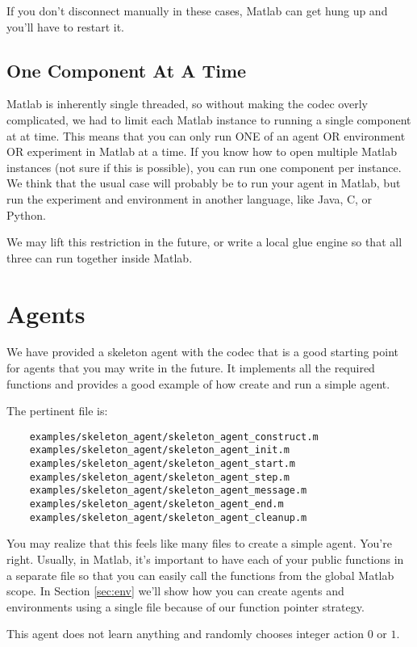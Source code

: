 \documentclass[11pt]{article}
\begin{document}
If you don't disconnect manually in these cases, Matlab can get hung up and you'll have to restart it.

\subsection{One Component At A Time}
Matlab is inherently single threaded, so without making the codec overly complicated, we had to limit each Matlab instance to running a single component at at time.
This means that you can only run ONE of an agent OR environment OR experiment in Matlab at a time.  If you know how to open multiple Matlab instances (not sure if this is possible), you can run one
component per instance.  We think that the usual case will probably be to run your agent in Matlab, but run the experiment and environment in another language, like Java, C, or Python.

We may lift this restriction in the future, or write a local glue engine so that all three can run together inside Matlab.

\section{Agents}
\label{sec:agent}
We have provided a skeleton agent with the codec that is a good starting point for agents that you may write in the future.
It implements all the required functions and provides a good example of how create and run a simple agent.

The pertinent file is:
\begin{verbatim}
	examples/skeleton_agent/skeleton_agent_construct.m
	examples/skeleton_agent/skeleton_agent_init.m
	examples/skeleton_agent/skeleton_agent_start.m
	examples/skeleton_agent/skeleton_agent_step.m
	examples/skeleton_agent/skeleton_agent_message.m
	examples/skeleton_agent/skeleton_agent_end.m
	examples/skeleton_agent/skeleton_agent_cleanup.m
\end{verbatim}

You may realize that this feels like many files to create a simple agent. You're right.  Usually, in Matlab, it's important to have each of your public functions in a separate file 
so that you can easily call the functions from the global Matlab scope.  In Section \ref{sec:env} we'll show how you can create agents and environments using a single file because of 
our function pointer strategy.


This agent does not learn anything and randomly chooses integer action $0$ or $1$.  
\end{document}
